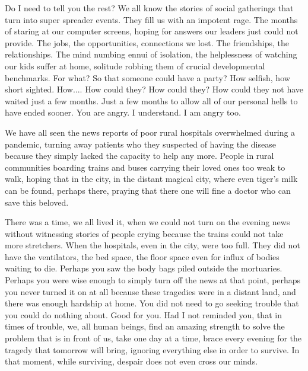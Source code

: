 \documentclass{amsart}
\begin{document}
Do I need to tell you the rest? We all know the stories of social gatherings that turn into super spreader events. They fill us with an impotent rage. The months of staring at our computer screens, hoping for answers our leaders just could not provide. The jobs, the opportunities, connections we lost. The friendships, the relationships.  The mind numbing ennui of isolation, the helplessness of watching our kids suffer at home, solitude robbing them of crucial developmental benchmarks. For what? So that someone could have a party? How selfish, how short sighted. How.... How could they? How could they? How could they not have waited just a few months. Just a few months to allow all of our personal hells to have ended sooner. You are angry. I understand. I am angry too. 

We have all seen the news reports of poor rural hospitals overwhelmed during a pandemic, turning away patients who they suspected of having the disease because they simply lacked the capacity to help any more. People in rural communities boarding trains and buses carrying their loved ones too weak to walk, hoping that in the city, in the distant magical city, where even tiger's milk can be found, perhaps there, praying that there one will fine a doctor who can save this beloved. 

There was a time, we all lived it, when we could not turn on the evening news without witnessing stories of people crying because the trains could not take more stretchers. When the hospitals, even in the city, were too full. They did not have the ventilators, the bed space, the floor space even for influx of bodies waiting to die. Perhaps you saw the body bags piled outside the mortuaries. Perhaps you were wise enough to simply turn off the news at that point, perhaps you never turned it on at all because these tragedies were in a distant land, and there was enough hardship at home. You did not need to go seeking trouble that you could do nothing about. Good for you. Had I not reminded you, that in times of trouble, we, all human beings, find an amazing strength to solve the problem that is in front of us, take one day at a time, brace every evening for the tragedy that tomorrow will bring, ignoring everything else in order to survive. In that moment, while surviving, despair does not even cross our minds.
\end{document}
